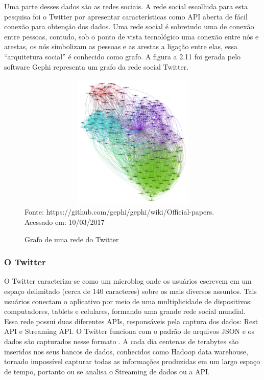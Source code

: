Uma parte desses dados são as redes sociais. A rede social escolhida para esta pesquisa foi o Twitter por apresentar características como API aberta de fácil conexão para obtenção dos dados. Uma rede social é sobretudo uma de conexão entre pessoas, contudo, sob o ponto de vista tecnológico uma conexão entre nós e arestas, os nós simbolizam as pessoas e as arestas a ligação entre elas, essa ``arquitetura social'' é conhecido como grafo. A figura a 2.11 foi gerada pelo software Gephi \cite{ICWSM09154} representa um grafo da rede social Twitter.

\begin{figure}[!ht]
	\centering
	\caption{Grafo de uma rede do Twitter}
	\vspace{1mm}
	\includegraphics[width=120mm, height=65mm]{Figuras/BigData/grafoExemplo.png}\\
	\tiny Fonte: https://github.com/gephi/gephi/wiki/Official-papers. Acessado em: 10/03/2017
\end{figure}



\subsubsection{O Twitter}

O Twitter caracteriza-se como um microblog onde os usuários escrevem em um espaço delimitado (cerca de 140 caracteres) sobre os mais diversos assuntos. Tais usuários conectam o aplicativo por meio de uma multiplicidade de dispositivos: computadores, tablets e celulares, formando uma grande rede social mundial. Essa rede possui duas diferentes APIs, responsáveis pela captura dos dados: Rest API e Streaming API. O Twitter funciona com o padrão de arquivos JSON e os dados são capturados nesse formato \cite{francca14big}. A cada dia centenas de terabytes são inseridos nos seus bancos de dados, conhecidos como Hadoop data warehouse, tornado impossível capturar todas as informações produzidas em um largo espaço de tempo, portanto ou se analisa o Streaming de dados ou a API.

